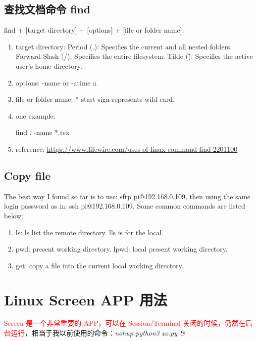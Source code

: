 \documentclass[UTF8,fancyhdr,a4paper]{ctexart}
\newcommand{\pflred}[1]{\textcolor{red}{#1}}
\begin{document}
\subsection{查找文档命令 find}

find + [target directory] + [options] + [file or folder name]:
\begin{enumerate}
\item
target directory:
Period (.): Specifies the current and all nested folders.
Forward Slash (/): Specifies the entire filesystem.
Tilde (\~): Specifies the active user's home directory.
\item
options:
-name or -atime n
\item
file or folder name:
* start sign represents wild card.
\item
one example:

find . -name *.tex
\item
reference:
\url	{https://www.lifewire.com/uses-of-linux-command-find-2201100}


\end{enumerate}

\subsection{Copy file}

The best way I found so far is to use: sftp pi@192.168.0.109, then using the same login password as in: ssh pi@192.168.0.109.
Some common commands are listed below:
\begin{enumerate}
\item ls: ls list the remote directory. lls is for the local.
\item pwd: present working directory. lpwd: local present working directory.
\item get: copy a file into the current local working directory.

\end{enumerate}





\newpage

\section{Linux Screen APP 用法}
\pflred{Screen 是一个非常重要的 APP，可以在 Session/Terminal 关闭的时候，仍然在后台运行}，相当于我以前使用的命令：\textit{nohup python3 xx.py \&}
\end{document}
